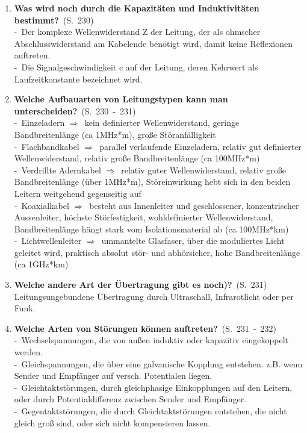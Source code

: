 \documentclass[a4paper,12pt]{article}
\newcommand{\question}[3]{\pagebreak[3]\item {\textbf{#1?}}\ (S.\ #2)#3}
\newcommand{\catchword}[1]{\\-\ #1}
\newcommand{\normaltext}[1]{\\#1}
\newcommand{\resultol}[1]{$\Rightarrow$\ #1}
\newcommand{\page}[1]{#1}
\newcommand{\pages}[2]{#1\ -\ #2}
\begin{document}
\begin{enumerate}
  \question{Was wird noch durch die Kapazitäten und Induktivitäten bestimmt}{\page{230}}
  {
    \catchword{Der komplexe Wellenwiderstand Z der Leitung, der als ohmscher Abschlusswiderstand
               am Kabelende benötigt wird, damit keine Reflexionen auftreten.}
    \catchword{Die Signalgeschwindigkeit c auf der Leitung, deren Kehrwert als Laufzeitkonstante
               bezeichnet wird.}
  }

  \question{Welche Aufbauarten von Leitungstypen kann man unterscheiden}{\pages{230}{231}}
  {
    \catchword{Einzeladern \resultol{kein definierter Wellenwiderstand, geringe Bandbreitenlänge
               (ca 1MHz*m), große Störanfälligkeit}}
    \catchword{Flachbandkabel \resultol{parallel verlaufende Einzeladern, relativ gut definierter
               Wellenwiderstand, relativ große Bandbreitenlänge (ca 100MHz*m)}}
    \catchword{Verdrillte Adernkabel \resultol{relativ guter Wellenwiderstand, relativ große 
               Bandbreitenlänge (über 1MHz*m), Störeinwirkung hebt sich in den beiden Leitern weitgehend
               gegenseitig auf}}
    \catchword{Koaxialkabel \resultol{besteht aus Innenleiter und geschlossener, konzentrischer
               Aussenleiter, höchste Störfestigkeit, wohldefinierter Wellenwiderstand, Bandbreitenlänge
               hängt stark vom Isolationsmaterial ab (ca 100MHz*km)}}
    \catchword{Lichtwellenleiter \resultol{ummantelte Glasfaser, über die moduliertes Licht geleitet
               wird, praktisch absolut stör- und abhörsicher, hohe Bandbreitenlänge (ca 1GHz*km)}}
  }

  \question{Welche andere Art der Übertragung gibt es noch)}{\page{231}}
  {
    \normaltext{Leitungsungebundene Übertragung durch Ultraschall, Infrarotlicht oder per Funk.}
  }

  \question{Welche Arten von Störungen können auftreten}{\pages{231}{232}}
  {
    \catchword{Wechselspannungen, die von außen induktiv oder kapazitiv eingekoppelt werden.}
    \catchword{Gleichspannungen, die über eine galvanische Kopplung entstehen. z.B. wenn Sender und
               Empfänger auf versch. Potentialen liegen.}
    \catchword{Gleichtaktstörungen, durch gleichphasige Einkopplungen auf den Leitern, oder durch
               Potentialdifferenz zwischen Sender und Empfänger.}
    \catchword{Gegentaktstörungen, die durch Gleichtaktstörungen entstehen, die nicht gleich groß
               sind, oder sich nicht kompensieren lassen.}
  }


\end{enumerate}
\end{document}
